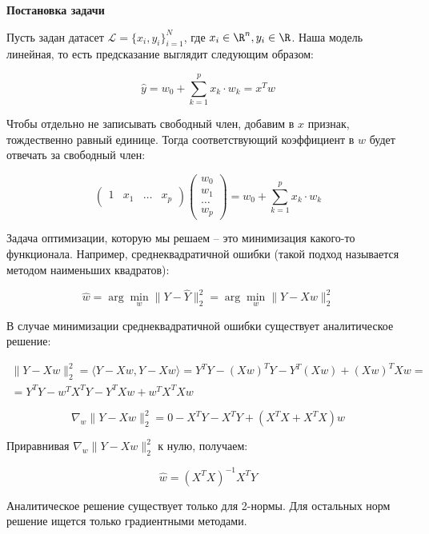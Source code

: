 \textbf{Постановка задачи}

Пусть задан датасет \( \mathcal{L} = \{x_i, y_i\}_{i = 1}^N\),
где \(x_i \in \R^n, y_i \in \R\).
Наша модель линейная, то есть предсказание выглядит следующим образом:

\[
\widehat{y} = w_0 + \sum_{k = 1}^p x_k \cdot w_k = x^T w
\]

Чтобы отдельно не записывать свободный член, добавим в $x$ признак, тождественно равный единице. Тогда соответствующий коэффициент в $w$ будет отвечать за свободный член:

\[
\begin{pmatrix}
1 & x_1 & \ldots & x_p
\end{pmatrix}
\begin{pmatrix}
w_0 \\
w_1 \\
\ldots \\
w_p
\end{pmatrix}
= w_0 + \sum_{k = 1}^p x_k \cdot w_k
\]

Задача оптимизации, которую мы решаем -- это минимизация какого-то функционала. Например, среднеквадратичной ошибки (такой подход называется методом наименьших квадратов):

\[
\widehat{w} = \arg \min_w \|Y - \widehat{Y}\|_2^2 = 
\arg \min_w \|Y - Xw\|_2^2
\]

В случае минимизации среднеквадратичной ошибки существует аналитическое решение:

\begin{multline*}
\|Y - Xw\|_2^2 = \langle Y - Xw, Y - Xw \rangle = 
Y^T Y - (Xw)^T Y - Y^T (Xw) + (Xw)^T Xw = \\
= Y^T Y - w^T X^T Y - Y^T X w + w^T X^T X w
\end{multline*}

\[
\nabla_w \|Y - Xw\|_2^2 = 0 - X^T Y - X^T Y + 
\left( X^T X + X^T X \right) w
\]

Приравнивая \(\nabla_w \|Y - Xw\|_2^2\) к нулю, получаем:

\[
\widehat{w} = (X^T X)^{-1} X^T Y
\]

\begin{note}
Аналитическое решение существует только для 2-нормы. Для остальных норм решение ищется только градиентными методами.
\end{note}

